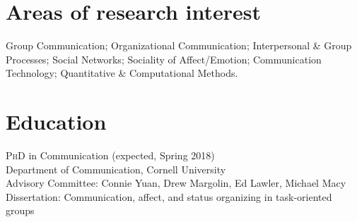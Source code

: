 \documentclass[11pt, letterpaper]{article} %
\newcommand{\years}[1]{\leavevmode\marginnote{\scriptsize #1}} %
\begin{document}

\section*{Areas of research interest}

Group Communication; Organizational Communication; Interpersonal \& Group Processes; Social Networks; Sociality of Affect/Emotion; Communication Technology; Quantitative \& Computational Methods. %





\section*{Education}

\years{2012-}\textsc{PhD} in Communication (expected, Spring 2018)\\
    \textsf{
        Department of Communication, Cornell University\\
        Advisory Committee: Connie Yuan, Drew Margolin, Ed Lawler, Michael Macy\\
        Dissertation: Communication, affect, and status organizing in task-oriented groups
            } 
\end{document}
